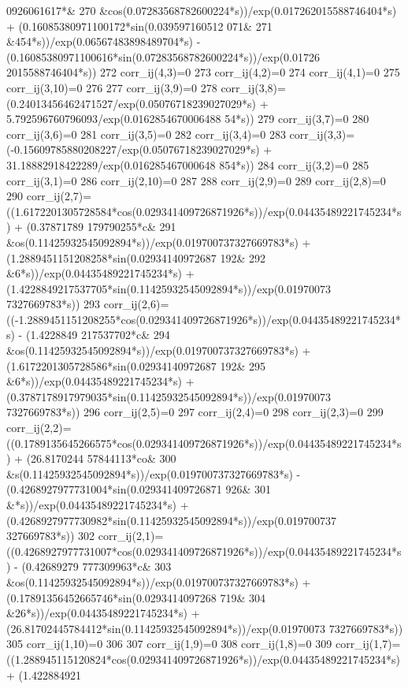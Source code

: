 \begin{DoxyCode}
      0926061617*&
270          &cos(0.07283568782600224*s))/exp(0.017262015588746404*s) + (0.16085380971100172*sin(0.039597160512
      071&
271          &454*s))/exp(0.06567483898489704*s) - (0.16085380971100616*sin(0.07283568782600224*s))/exp(0.01726
      2015588746404*s)) 
272     corr\_ij(4,3)=0
273     corr\_ij(4,2)=0
274     corr\_ij(4,1)=0
275     corr\_ij(3,10)=0
276 
277     corr\_ij(3,9)=0
278     corr\_ij(3,8)=(0.24013456462471527/exp(0.05076718239027029*s) + 5.792596760796093/exp(0.0162854670006488
      54*s)) 
279     corr\_ij(3,7)=0
280     corr\_ij(3,6)=0
281     corr\_ij(3,5)=0
282     corr\_ij(3,4)=0
283     corr\_ij(3,3)=(-0.15609785880208227/exp(0.05076718239027029*s) + 31.18882918422289/exp(0.016285467000648
      854*s)) 
284     corr\_ij(3,2)=0
285     corr\_ij(3,1)=0
286     corr\_ij(2,10)=0
287 
288     corr\_ij(2,9)=0
289     corr\_ij(2,8)=0
290     corr\_ij(2,7)=((1.6172201305728584*cos(0.029341409726871926*s))/exp(0.04435489221745234*s) + (0.37871789
      179790255*c&
291          &os(0.11425932545092894*s))/exp(0.019700737327669783*s) + (1.2889451151208258*sin(0.02934140972687
      192&
292          &6*s))/exp(0.04435489221745234*s) + (1.4228849217537705*sin(0.11425932545092894*s))/exp(0.01970073
      7327669783*s)) 
293     corr\_ij(2,6)=((-1.2889451151208255*cos(0.029341409726871926*s))/exp(0.04435489221745234*s) - (1.4228849
      217537702*c&
294          &os(0.11425932545092894*s))/exp(0.019700737327669783*s) + (1.6172201305728586*sin(0.02934140972687
      192&
295          &6*s))/exp(0.04435489221745234*s) + (0.3787178917979035*sin(0.11425932545092894*s))/exp(0.01970073
      7327669783*s)) 
296     corr\_ij(2,5)=0
297     corr\_ij(2,4)=0
298     corr\_ij(2,3)=0
299     corr\_ij(2,2)=((0.1789135645266575*cos(0.029341409726871926*s))/exp(0.04435489221745234*s) + (26.8170244
      57844113*co&
300          &s(0.11425932545092894*s))/exp(0.019700737327669783*s) - (0.4268927977731004*sin(0.029341409726871
      926&
301          &*s))/exp(0.04435489221745234*s) + (0.4268927977730982*sin(0.11425932545092894*s))/exp(0.019700737
      327669783*s)) 
302     corr\_ij(2,1)=((0.4268927977731007*cos(0.029341409726871926*s))/exp(0.04435489221745234*s) - (0.42689279
      777309963*c&
303          &os(0.11425932545092894*s))/exp(0.019700737327669783*s) + (0.17891356452665746*sin(0.0293414097268
      719&
304          &26*s))/exp(0.04435489221745234*s) + (26.81702445784412*sin(0.11425932545092894*s))/exp(0.01970073
      7327669783*s)) 
305     corr\_ij(1,10)=0
306 
307     corr\_ij(1,9)=0
308     corr\_ij(1,8)=0
309     corr\_ij(1,7)=((1.288945115120824*cos(0.029341409726871926*s))/exp(0.04435489221745234*s) + (1.422884921

\end{DoxyCode}
